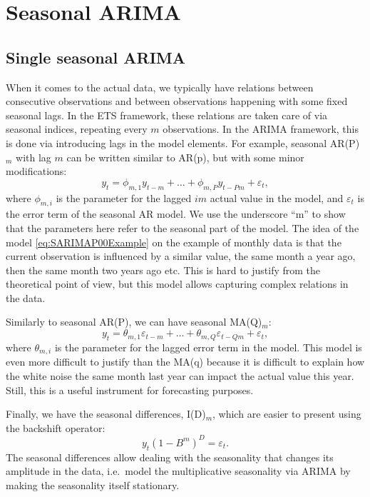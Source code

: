 \documentclass[]{book}
\theoremstyle{definition}
\theoremstyle{definition}
\theoremstyle{definition}
\theoremstyle{definition}
\theoremstyle{remark}
\begin{document}
\hypertarget{seasonal-arima}{%
\section{Seasonal ARIMA}\label{seasonal-arima}}

\hypertarget{single-seasonal-arima}{%
\subsection{Single seasonal ARIMA}\label{single-seasonal-arima}}

When it comes to the actual data, we typically have relations between consecutive observations and between observations happening with some fixed seasonal lags. In the ETS framework, these relations are taken care of via seasonal indices, repeating every \(m\) observations. In the ARIMA framework, this is done via introducing lags in the model elements. For example, seasonal AR(P)\(_m\) with lag \(m\) can be written similar to AR(p), but with some minor modifications:
\begin{equation}
  {y}_{t} = \phi_{m,1} y_{t-m} + \dots + \phi_{m,P} y_{t-Pm} + \varepsilon_t ,
  \label{eq:SARIMAP00Example}
\end{equation}
where \(\phi_{m,i}\) is the parameter for the lagged \(im\) actual value in the model, and \(\varepsilon_t\) is the error term of the seasonal AR model. We use the underscore ``m'' to show that the parameters here refer to the seasonal part of the model. The idea of the model \eqref{eq:SARIMAP00Example} on the example of monthly data is that the current observation is influenced by a similar value, the same month a year ago, then the same month two years ago etc. This is hard to justify from the theoretical point of view, but this model allows capturing complex relations in the data.

Similarly to seasonal AR(P), we can have seasonal MA(Q)\(_m\):
\begin{equation}
    {y}_{t} = \theta_{m,1} \varepsilon_{t-m} + \dots + \theta_{m,Q} \varepsilon_{t-Qm} + \varepsilon_t ,
  \label{eq:SARIMA00QExample}
\end{equation}
where \(\theta_{m,i}\) is the parameter for the lagged error term in the model. This model is even more difficult to justify than the MA(q) because it is difficult to explain how the white noise the same month last year can impact the actual value this year. Still, this is a useful instrument for forecasting purposes.

Finally, we have the seasonal differences, I(D)\(_m\), which are easier to present using the backshift operator:
\begin{equation}
  y_t (1-B^m)^D = \varepsilon_t.
  \label{eq:SARIMA0D0Example}
\end{equation}
The seasonal differences allow dealing with the seasonality that changes its amplitude in the data, i.e.~model the multiplicative seasonality via ARIMA by making the seasonality itself stationary.
\end{document}
